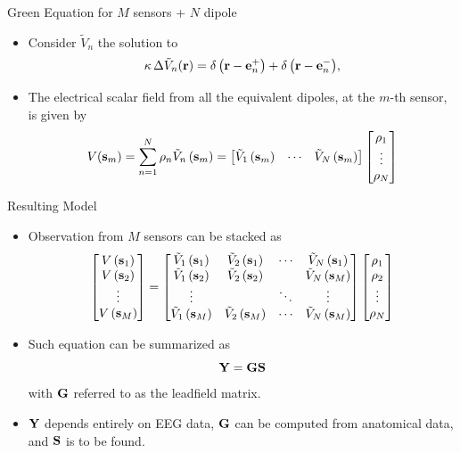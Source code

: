 \documentclass[progressbar=head]{beamer}
\begin{document}
\begin{frame}{Green Equation for $M$ sensors + $N$ dipole}
\begin{itemize}
\item Consider $\tilde{V}_n$ the solution to 
\begin{equation}
\kappa\, \Delta { \tilde{V}_n(\mathbf{r}) } = 
{ \delta\left( \mathbf{r}-\mathbf{e}_n^+ \right) + \delta\left( \mathbf{r}-\mathbf{e}_n^- \right) },
\end{equation}
\item The electrical scalar field from all the equivalent dipoles, at the $m$-th sensor, is given by
\begin{equation}
V(\mathbf{s}_m) = \sum_{n=1}^N \rho_n \tilde{V}_n \left( \mathbf{s}_m \right)
=
\begin{bmatrix}
\tilde{V}_1 \left( \mathbf{s}_m \right) &
\cdots &
\tilde{V}_N \left( \mathbf{s}_m \right)
\end{bmatrix}
\begin{bmatrix}
\rho_1 \\ \vdots \\ \rho_N
\end{bmatrix}
\label{eq:stack}
\end{equation}
\end{itemize}
\end{frame}

\begin{frame}{Resulting Model}
\begin{itemize}
\item Observation from $M$ sensors can be stacked as
\begin{equation}
\begin{bmatrix}
V\left( \mathbf{s}_1 \right)
\\
V\left( \mathbf{s}_2 \right)
\\
\vdots \\
V\left( \mathbf{s}_M \right)
\end{bmatrix}
=
\begin{bmatrix}
\tilde{V}_1 \left( \mathbf{s}_1 \right) &
\tilde{V}_2 \left( \mathbf{s}_1 \right) &
\cdots &
\tilde{V}_N \left( \mathbf{s}_1 \right) \\
\tilde{V}_1 \left( \mathbf{s}_2 \right) &
\tilde{V}_2 \left( \mathbf{s}_2 \right) &
&
\tilde{V}_N \left( \mathbf{s}_M \right) \\
\vdots &  & \ddots & \vdots \\
\tilde{V}_1 \left( \mathbf{s}_M \right) &
\tilde{V}_2 \left( \mathbf{s}_M \right) &
\cdots &
\tilde{V}_N \left( \mathbf{s}_M \right)
\end{bmatrix}
\begin{bmatrix}
\rho_1 \\ \rho_2 \\ \vdots \\ \rho_N
\end{bmatrix}
\end{equation}
\item Such equation can be summarized as
\begin{equation}
\mathbf{Y} = \mathbf{G} \mathbf{S}
\end{equation}
with $\mathbf{G}$ referred to as the \alert{leadfield matrix}.
\item $\mathbf{Y}$ depends entirely on EEG data, $\mathbf{G}$ can be computed from anatomical data, and $\mathbf{S}$ is to be found.
\end{itemize}
\end{frame}
\end{document}
